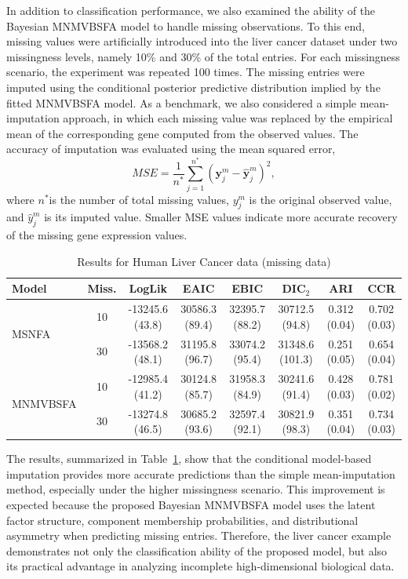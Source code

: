 \documentclass[twoside]{article}
\theoremstyle{definition}
\begin{document}
In addition to classification performance, we also examined the ability of the Bayesian MNMVBSFA model to handle missing observations. To this end, missing values were artificially introduced into the liver cancer dataset under two missingness levels, namely 10\% and 30\% of the total entries. For each missingness scenario, the experiment was repeated 100 times. The missing entries were imputed using the conditional posterior predictive distribution implied by the fitted MNMVBSFA model. As a benchmark, we also considered a simple mean-imputation approach, in which each missing value was replaced by the empirical mean of the corresponding gene computed from the observed values. The accuracy of imputation was evaluated using the mean squared error,
\[
MSE=\frac{1}{n^*}
\sum_{j=1}^{n^*}
\left(\bm y_{j}^m-\hat{\bm y}_{j}^m\right)^2,
\]
where \(n^*\)is the number of total missing values, \(y_{j}^m\) is the original observed value, and \(\hat{y}_{j}^m\) is its imputed value. Smaller MSE values indicate more accurate recovery of the missing gene expression values.
\begin{table}[!ht]
	\centering
	\caption{Results for Human Liver Cancer data (missing data)}
	\scriptsize
	\setlength{\tabcolsep}{4pt}
	\begin{tabular}{lccccccc}
		\hline
		Model & Miss. & LogLik & EAIC & EBIC & DIC$_2$ & ARI & CCR \\
		\hline
		
		\multirow{2}{*}{MSNFA}
		& 10
		& -13245.6 (43.8)
		& 30586.3 (89.4)
		& 32395.7 (88.2)
		& 30712.5 (94.8)
		& 0.312 (0.04)
		& 0.702 (0.03)
		\\
		& 30
		& -13568.2 (48.1)
		& 31195.8 (96.7)
		& 33074.2 (95.4)
		& 31348.6 (101.3)
		& 0.251 (0.05)
		& 0.654 (0.04)
		\\
		
		\multirow{2}{*}{MNMVBSFA}
		& 10
		& {-12985.4 (41.2)}
		& {30124.8 (85.7)}
		& {31958.3 (84.9)}
		& {30241.6 (91.4)}
		& {0.428 (0.03)}
		& {0.781 (0.02)}
		\\
		& 30
		& {-13274.8 (46.5)}
		& {30685.2 (93.6)}
		& {32597.4 (92.1)}
		& {30821.9 (98.3)}
		& {0.351 (0.04)}
		& {0.734 (0.03)}
		\\
		\hline
		
	\end{tabular}
	\label{tab:liver-missing}
\end{table}
The results, summarized in Table~\ref{tab:liver-missing}, show that the conditional model-based imputation provides more accurate predictions than the simple mean-imputation method, especially under the higher missingness scenario. This improvement is expected because the proposed Bayesian MNMVBSFA model uses the latent factor structure, component membership probabilities, and distributional asymmetry when predicting missing entries. Therefore, the liver cancer example demonstrates not only the classification ability of the proposed model, but also its practical advantage in analyzing incomplete high-dimensional biological data.
\end{document}
